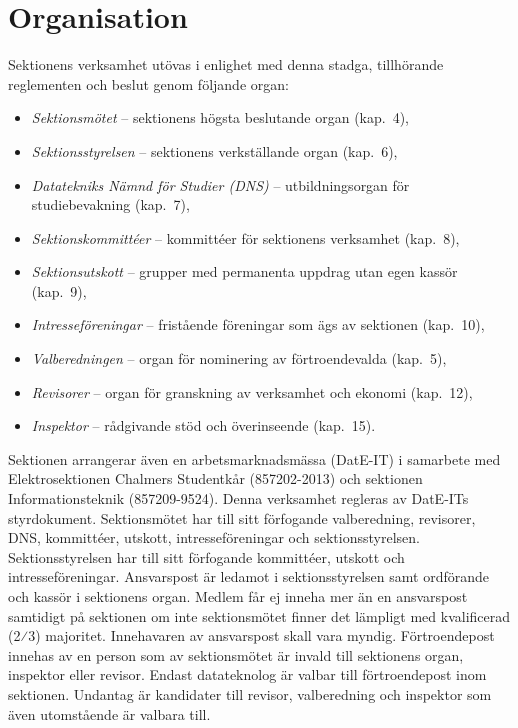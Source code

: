 \documentclass[a4paper]{dtek}
\begin{document}
\section{Organisation}
 Sektionens verksamhet utövas i enlighet med denna stadga, tillhörande reglementen och beslut genom följande organ:
\begin{itemize}\setlength\itemsep{0em}
\item \textit{Sektionsmötet} – sektionens högsta beslutande organ (kap.~4),
\item \textit{Sektionsstyrelsen} – sektionens verkställande organ (kap.~6),
\item \textit{Datatekniks Nämnd för Studier (DNS)} – utbildningsorgan för studiebevakning (kap.~7),
\item \textit{Sektionskommittéer} – kommittéer för sektionens verksamhet (kap.~8),
\item \textit{Sektionsutskott} – grupper med permanenta uppdrag utan egen kassör (kap.~9),
\item \textit{Intresseföreningar} – fristående föreningar som ägs av sektionen (kap.~10),
\item \textit{Valberedningen} – organ för nominering av förtroendevalda (kap.~5),
\item \textit{Revisorer} – organ för granskning av verksamhet och ekonomi (kap.~12),
\item \textit{Inspektor} – rådgivande stöd och överinseende (kap.~15).
\end{itemize}
\stycke Sektionen arrangerar även en arbetsmarknadsmässa (DatE-IT) i samarbete med Elektrosektionen Chalmers Studentkår (857202-2013) och sektionen Informationsteknik (857209-9524). Denna verksamhet regleras av DatE-ITs styrdokument. 
\para[Ansvarsförhållanden] Sektionsmötet har till sitt förfogande valberedning, revisorer, DNS, kommittéer, utskott, intresseföreningar och sektionsstyrelsen.
\para Sektionsstyrelsen har till sitt förfogande kommittéer, utskott och intresseföreningar.
\para[Ansvarspost] Ansvarspost är ledamot i sektionsstyrelsen samt ordförande och kassör i sektionens organ.
\para Medlem får ej inneha mer än en ansvarspost samtidigt på sektionen om inte
sektionsmötet finner det lämpligt med kvalificerad (2⁄3) majoritet.
\para Innehavaren av ansvarspost skall vara myndig.
\para[Förtroendepost] Förtroendepost innehas av en person som av sektionsmötet är invald till sektionens organ, inspektor eller revisor.
\para Endast datateknolog är valbar till förtroendepost inom sektionen. 
\stycke Undantag är kandidater till revisor, valberedning och inspektor som även utomstående är valbara till.
\end{document}
